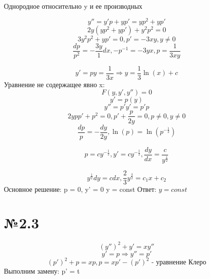 \documentclass{article}
\begin{document}
Однородное относительно y и ее производных

\begin{equation*}
    y'' = y'p + yp' = yp^2 + yp'
\end{equation*}
\begin{equation*}
    2y(yp^2 + yp') + y^2p^2 = 0
\end{equation*}
\begin{equation*}
    3y^2p^2 + yp' = 0, p' = -3xy, y \ne 0
\end{equation*}
\begin{equation*}
    \frac{dp}{p^2} = -\frac{3y}{1}dx, -p^{-1} = -3yx, p = \frac{1}{3xy}
\end{equation*}

\begin{equation*}
    y' = py = \frac{1}{3x} \Rightarrow y = \frac{1}{3}\ln{(x)} + c
\end{equation*}
Уравнение не содержащее явно x:
\begin{equation*}
    F(y, y', y'') = 0
\end{equation*}
\begin{equation*}
    y' = p(y) 
\end{equation*}
\begin{equation*}
    y'' = p'y' = p'p
\end{equation*}
\begin{equation*}
    2ypp' + p^2 = 0, p' + \frac{p}{2y} = 0, p \ne 0 , y \ne 0
\end{equation*}
\begin{equation*}
    \frac{dp}{p} = -\frac{dy}{2y} , \ln{(p)} = \ln{(p^{-\frac{1}{2}})}
\end{equation*}

\begin{equation*}
    p = c y^{-\frac{1}{2}}, y' = cy^{-\frac{1}{2}}, \frac{dy}{dx} = \frac{c}{y^{\frac{1}{2}}}
\end{equation*}

\begin{equation*}
    y^{\frac{1}{2}}dy = cdx, \frac{2}{3}y^{\frac{3}{2}} = c_1x + c_2
\end{equation*}
Основное решение:
p = 0, y' = 0 \Rightarrow y = const
Ответ: $ y = const$

\section*{№2.3}
\begin{equation*}
    (y'')^2 + y' = xy''
\end{equation*}
\begin{equation*}
    y' = p \Rightarrow y'' = p'
\end{equation*}
\begin{equation*}
    (p')^2 + p = xp, p = xp' - (p')^2 \text{ - уравнение Клеро}
\end{equation*}
Выполним замену: p' = t
\end{document}
